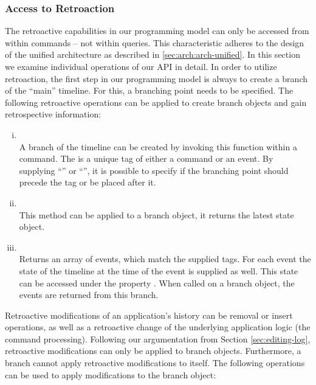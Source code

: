 \subsubsection{Access to Retroaction}
The retroactive capabilities in our programming model can only be accessed from 
within commands -- not within queries. This characteristic adheres to the design 
of the unified architecture as described in \ref{sec:arch:arch-unified}.
In this section we examine individual operations of our API in detail.
%
In order to utilize retroaction, the first step in our programming model is 
always to create a branch of the ``main'' timeline. For this, a branching point 
needs to be specified. The following retroactive operations can be applied to 
create branch objects and gain retrospective information:

\begin{enumerate}[(i)] 
	\item {}\\
	A branch of the timeline can be created by invoking this function within a command.
	The  is a unique tag of either a command or an event.
	By supplying ``'' or ``'', it is possible to specify 
	if the branching point should precede the tag or be placed after it.

	\item {}\\
	This method can be applied to a branch object, it returns the latest state object. 

	\item 
	\\
	Returns an array of events, which match the supplied tags.
	For each event the state of the timeline at the time of the event
	is supplied as well. This state can be accessed under the property 
	.
	When called on a branch object, the events are returned from this branch.
\end{enumerate}

Retroactive modifications of an application's history can be removal or insert 
operations, as well as a retroactive change of the underlying application logic 
(the command processing). 
Following our argumentation from Section \ref{sec:editing-log}, retroactive 
modifications can only be applied to branch objects.
%
Furthermore, a branch cannot apply retroactive modifications to itself.
The following operations can be used to apply modifications to the branch object:

